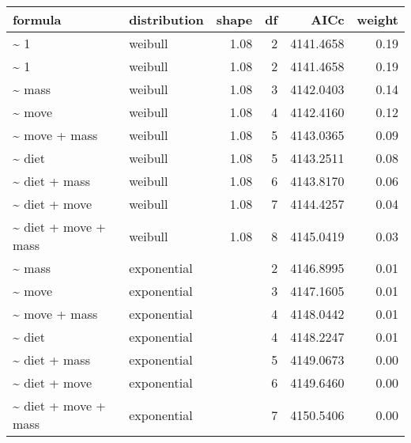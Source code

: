 \begin{table}[ht]
\centering
\begin{tabular}{llrrrr}
 formula & distribution & shape & df & AICc & weight \\ 
  \hline
\~{} 1 & weibull & 1.08 & 2 & 4141.4658 & 0.19 \\ 
  \~{} 1 & weibull & 1.08 & 2 & 4141.4658 & 0.19 \\ 
  \~{} mass & weibull & 1.08 & 3 & 4142.0403 & 0.14 \\ 
  \~{} move & weibull & 1.08 & 4 & 4142.4160 & 0.12 \\ 
  \~{} move + mass & weibull & 1.08 & 5 & 4143.0365 & 0.09 \\ 
  \~{} diet & weibull & 1.08 & 5 & 4143.2511 & 0.08 \\ 
  \~{} diet + mass & weibull & 1.08 & 6 & 4143.8170 & 0.06 \\ 
  \~{} diet + move & weibull & 1.08 & 7 & 4144.4257 & 0.04 \\ 
  \~{} diet + move + mass & weibull & 1.08 & 8 & 4145.0419 & 0.03 \\ 
  \~{} mass & exponential &  & 2 & 4146.8995 & 0.01 \\ 
  \~{} move & exponential &  & 3 & 4147.1605 & 0.01 \\ 
  \~{} move + mass & exponential &  & 4 & 4148.0442 & 0.01 \\ 
  \~{} diet & exponential &  & 4 & 4148.2247 & 0.01 \\ 
  \~{} diet + mass & exponential &  & 5 & 4149.0673 & 0.00 \\ 
  \~{} diet + move & exponential &  & 6 & 4149.6460 & 0.00 \\ 
  \~{} diet + move + mass & exponential &  & 7 & 4150.5406 & 0.00 \\ 
  \end{tabular}
\label{tab:nag}
\end{table}

